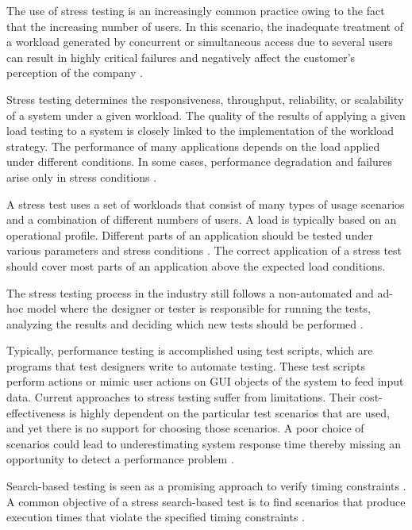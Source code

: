 \documentclass{bmcart}
\begin{document}
The use of stress testing is an increasingly common practice owing to the fact that the increasing number of users. In this scenario, the inadequate treatment of a workload generated by concurrent or simultaneous access due to several users can result in highly critical failures and negatively affect the customer's perception of the company \citep{Draheim2006b} \citep{Jiang2010}. 

Stress testing determines the responsiveness, throughput, reliability, or scalability of a system under a given workload. The quality of the results of applying a given load testing to a system is closely linked to the implementation of the workload strategy. The performance of many applications depends on the load applied under different conditions. In some cases, performance degradation and failures arise only in stress conditions \citep{Garousi2010} \citep{Jiang2010}.


A stress test uses a set of workloads that consist of many types of usage scenarios and a combination of different numbers of users. A load is typically based on an operational profile. Different parts of an application should be tested under various parameters and stress conditions \citep{Babbar2011}. The correct application of a stress test should cover most parts of an application above the expected load conditions\citep{Draheim2006b}.

The stress testing process in the industry still follows a non-automated and ad-hoc model where the designer or tester is responsible for running the tests, analyzing the results and deciding which new tests should be performed \citep{Lewis2005}. 

Typically, performance testing is accomplished using test scripts, which are programs that test designers write to automate testing. These test scripts perform actions or mimic user actions on GUI objects of the system to feed input data. Current approaches to stress testing suffer from limitations. Their cost-effectiveness is highly dependent on the particular test scenarios that are used, and yet there is no support for choosing those scenarios. A poor choice of scenarios could lead to underestimating system response time thereby missing an opportunity to detect a performance problem \citep{Grechanik2012}.

Search-based testing is seen as a promising approach to verify timing constraints \citep{Afzal2009a}. A common objective of a stress search-based test is to find  scenarios that produce execution times that violate the specified timing constraints \citep{Sullivan}. 
\end{document}
